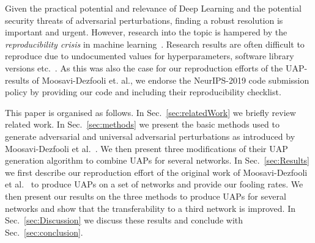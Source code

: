 \documentclass[runningheads]{llncs}
\begin{document}
Given the practical potential and relevance of Deep Learning and the potential security threats of adversarial perturbations, finding a robust resolution is important and urgent. However, research into the topic is hampered by the \emph{reproducibility crisis} in machine learning~\cite{raff2020quantifying}. Research results are often difficult to reproduce due to undocumented values for hyperparameters, software library versions etc.~\cite{Gundersen2018StateOT}. As this was also the case for our reproduction efforts of the UAP-results of Moosavi-Dezfooli et. al., we endorse the NeurIPS-2019 code submission policy by providing our code and including their reproducibility checklist.


This paper is organised as follows. In Sec.~\ref{sec:relatedWork} we briefly review related work. In Sec.~\ref{sec:methods} we present the basic methods used to generate adversarial and universal adversarial perturbations as introduced by Moosavi-Dezfooli et al.~\cite{moosavidezfooli_universal_2017}. We then present three modifications of their UAP generation algorithm to combine UAPs for several networks. In Sec.~\ref{sec:Results} we first describe our reproduction effort of the original work of Moosavi-Dezfooli et al.~\cite{moosavidezfooli_universal_2017} to produce UAPs on a set of networks and provide our fooling rates. We then present our results on the three methods to produce UAPs for several networks and show that the transferability to a third network is improved. In Sec.~\ref{sec:Discussion} we discuss these results and conclude with Sec.~\ref{sec:conclusion}.
\end{document}

